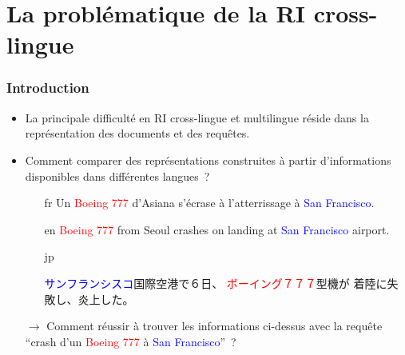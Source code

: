 \documentclass[12pt,aspectratio=43,dvipsnames,table]{beamer}
\begin{document}
\section{La problématique de la RI cross-lingue}


\begin{frame}
    \frametitle{Introduction}
    \begin{itemize} \itemsep10pt
        \item La principale difficulté en RI cross-lingue et multilingue réside 
              dans la représentation des documents et des requêtes.
        \item Comment comparer des représentations construites à partir 
              d'informations disponibles dans différentes langues~?

        \begin{itemize} 
          \item[fr] Un \textcolor<2>{red}{Boeing 777} d'Asiana 
                    s'\textcolor<2>{JungleGreen}{écrase} à l'atterrissage à 
                    \textcolor<2>{blue}{San Francisco}.
          \item[en] \textcolor<2>{red}{Boeing 777} from Seoul 
                    \textcolor<2>{JungleGreen}{crashes} on landing at 
                    \textcolor<2>{blue}{San Francisco} airport.
          \item[jp] \begin{CJK*}{UTF8}{min}
                    \textcolor<2>{blue}{サンフランシスコ}国際空港で６日、
                    \textcolor<2>{red}{ボーイング７７７}型機が
                    \textcolor<2>{JungleGreen}{着陸に失敗し}、炎上した。
                    \end{CJK*}
        \end{itemize}
        \item[$\to$] Comment réussir à trouver les informations ci-dessus avec 
                     la requête ``\textcolor<2>{JungleGreen}{crash} d'un 
                     \textcolor<2>{red}{Boeing 777} à 
                     \textcolor<2>{blue}{San Francisco}''~?
    \end{itemize}
\end{frame}
\end{document}

